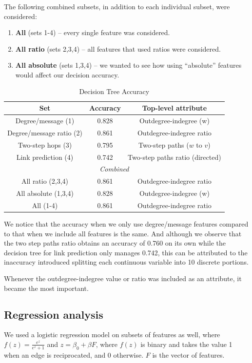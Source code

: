 \documentclass[conference]{IEEEtran}
\begin{document}
The following combined subsets, in addition to each individual subset, were considered:
\begin{enumerate}
	\item {\bf All} (sets 1-4) -- every single feature was considered.
	\item {\bf All ratio} (sets 2,3,4) -- all features that used ratios were considered.
	\item {\bf All absolute} (sets 1,3,4) -- we wanted to see how using ``absolute'' features would affect our decision accuracy.
\end{enumerate}
\begin{table}[!t]
\renewcommand{\arraystretch}{1.3}
\caption{Decision Tree Accuracy}
\label{table_recresults_dtree}
\centering
\begin{tabular}{|c||c|c|}
\hline
\bf{Set} & Accuracy & Top-level attribute \\
\hline
Degree/message (1) & 0.828 & Outdegree-indegree (w) \\
Degree/message ratio (2) & 0.861 & Outdegree-indegree ratio \\
Two-step hops (3) & 0.795 & Two-step paths ($w$ to $v$) \\
Link prediction (4) & 0.742 & Two-step paths ratio (directed) \\
\hline
\multicolumn{3}{|c|}{\emph{Combined}} \\
\hline
All ratio (2,3,4) & 0.861 & Outdegree-indegree ratio \\
All absolute (1,3,4) & 0.828 & Outdegree-indegree (w) \\
All (1-4) & 0.861 & Outdegree-indegree ratio \\
\hline
\end{tabular}
\end{table}

We notice that the accuracy when we only use degree/message features compared to that when we include all features is the same. And although we observe that the two step paths ratio obtains an accuracy of 0.760 on its own while the decision tree for link prediction only manages 0.742, this can be attributed to the inaccuracy introduced splitting each continuous variable into 10 discrete portions.

Whenever the outdegree-indegree value or ratio was included as an attribute, it became the most important.

\subsection{Regression analysis}
We used a logistic regression model on subsets of features as well, where $f(z) = \frac{e^z}{e^z+1}$ and $z = \beta_0 + \beta F$, where $f(z)$ is binary and takes the value 1 when an edge is reciprocated, and 0 otherwise. $F$ is the vector of features.
\end{document}
